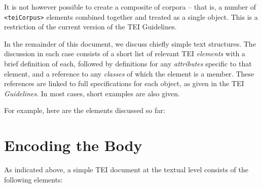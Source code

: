 \documentclass[11pt,twoside]{article}\makeatletter
\makeatletter
\renewcommand\section{\@startsection {section}{1}{\z@}%
     {-1.75ex \@plus -0.5ex \@minus -.2ex}%
     {0.5ex \@plus .2ex}%
     {\reset@font\Large\bfseries\sffamily}}
\def\DivI{\section}
\def\DivI{\chapter}
\makeatother
\begin{document}
It is not however possible to create a composite of corpora --
that is, a number of \texttt{<teiCorpus>} elements combined together
and treated as a single object. This is a restriction of the current
version of the TEI Guidelines.\par In the remainder of this document, we discuss chiefly simple text
structures. The discussion in each case consists of a short list of
relevant TEI \emph{elements} with a brief definition of each,
followed by definitions for any \emph{attributes} specific to
that element, and a reference to any \emph{classes} of which the
element is a member. These references are linked to full
specifications for each object, as given in the TEI
\textit{Guidelines}. In most cases, short examples are also given.\par For example, here are the elements discussed so far:

\DivI[Encoding the Body]{Encoding the Body}\label{U5-body}\par As indicated above, a simple TEI document at the textual level
consists of the following elements:
\end{document}
